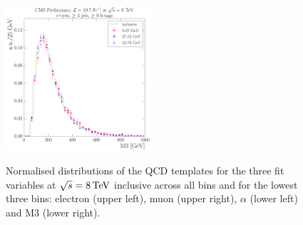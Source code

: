 \begin{figure}[hbtp]
     \includegraphics[width=0.48\textwidth]{Chapters/04_Analysis/04b_XSections/images/8TeV/fit_variables/WPT/M3/qcd/WPT_M3_0orMoreBtag_QCD_template_comparison.pdf}\\
	 \caption{Normalised distributions of the QCD templates for the three fit variables at $\sqrt{s}=8\,\text{Te\hspace{-.08em}V}$
	 inclusive across all \wpt bins and for the lowest three \wpt bins: electron \abseta (upper
	 left), muon \abseta (upper right), $\alpha$ (lower left) and M3 (lower right).}
     \label{fig:WPT_fit_variable_qcd_comparisons_8TeV}
\end{figure}